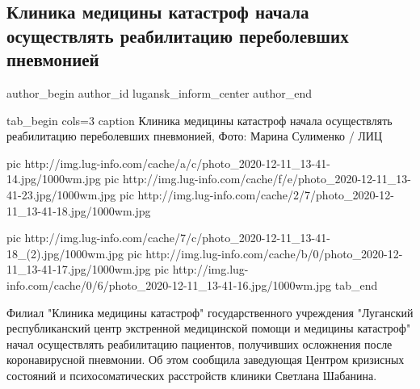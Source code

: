  
 
 
 
 
 
\subsection{Клиника медицины катастроф начала осуществлять реабилитацию переболевших пневмонией}
\label{sec:11_12_2020.news.lnr.lug_info.lugansk_inform_center.1.klinika_lugansk_pneumonia}
\ifcmt
	author_begin
   author_id lugansk_inform_center
	author_end
\fi


\ifcmt
tab_begin cols=3
	caption Клиника медицины катастроф начала осуществлять реабилитацию переболевших пневмонией, Фото: Марина Сулименко / ЛИЦ

	pic http://img.lug-info.com/cache/a/c/photo_2020-12-11_13-41-14.jpg/1000wm.jpg
	pic http://img.lug-info.com/cache/f/e/photo_2020-12-11_13-41-23.jpg/1000wm.jpg
	pic http://img.lug-info.com/cache/2/7/photo_2020-12-11_13-41-18.jpg/1000wm.jpg

	pic http://img.lug-info.com/cache/7/c/photo_2020-12-11_13-41-18_(2).jpg/1000wm.jpg
	pic http://img.lug-info.com/cache/b/0/photo_2020-12-11_13-41-17.jpg/1000wm.jpg
	pic http://img.lug-info.com/cache/0/6/photo_2020-12-11_13-41-16.jpg/1000wm.jpg
tab_end
\fi



Филиал "Клиника медицины катастроф" государственного учреждения "Луганский
республиканский центр экстренной медицинской помощи и медицины катастроф" начал
осуществлять реабилитацию пациентов, получивших осложнения после коронавирусной
пневмонии. Об этом сообщила заведующая Центром кризисных состояний и
психосоматических расстройств клиники Светлана Шабанина.

